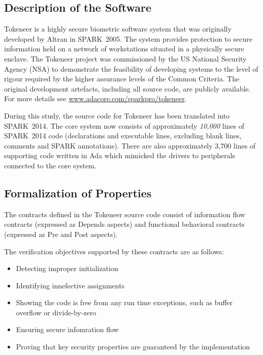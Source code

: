 \documentclass[10pt,a4paper,twocolumn]{article}
\newcommand{\oldspark}{SPARK~2005\xspace}
\newcommand{\newspark}{SPARK~2014\xspace}
\begin{document}

\subsection{Description of the Software}

Tokeneer is a highly secure biometric software system that was originally
developed by Altran in \oldspark. The system provides protection to secure
information held on a network of workstations situated in a physically
secure enclave. The Tokeneer project was commissioned by the US National
Security Agency (NSA) to demonstrate the feasibility of developing systems
to the level of rigour required by the higher assurance levels of the
Common Criteria. The original development artefacts, including all source code,
are publicly available. For more details see
\url{www.adacore.com/sparkpro/tokeneer}.

During this study, the source code for Tokeneer has been translated into \newspark.
The core system now consists of approximately \emph{10,000} lines of \newspark code
(declarations and executable lines, excluding blank lines, comments and
SPARK annotations). There are also approximately 3,700 lines of supporting
code written in Ada which mimicked the drivers to peripherals connected
to the core system.


\subsection{Formalization of Properties}

The contracts defined in the Tokeneer source code consist of information flow contracts (expressed as Depends aspects) and functional behavioral contracts (expressed as Pre and Post aspects).

The verification objectives supported by these contracts are as follows:

\begin{itemize}
\item Detecting improper initialization
\item Identifying innefective assignments
\item Showing the code is free from any run time exceptions, such as buffer overflow or divide-by-zero
\item Ensuring secure infomration flow
\item Proving that key security properties are guaranteed by the implementation
\end{itemize}
\end{document}
